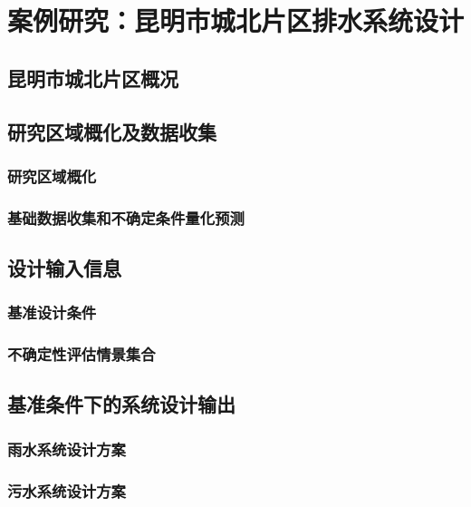 \documentclass[degree=doctor]{sysuthesis}
\begin{document}
\clearpage
\setcounter{page}{109}
\chapter{案例研究：昆明市城北片区排水系统设计}
\section{昆明市城北片区概况}

\clearpage
\setcounter{page}{110}
\section{研究区域概化及数据收集}
\subsection{研究区域概化}

\clearpage
\setcounter{page}{111}
\subsection{基础数据收集和不确定条件量化预测}

\clearpage
\setcounter{page}{115}
\section{设计输入信息}
\subsection{基准设计条件}

\clearpage
\setcounter{page}{120}
\subsection{不确定性评估情景集合}
\section{基准条件下的系统设计输出}
\subsection{雨水系统设计方案}

\clearpage
\setcounter{page}{124}
\subsection{污水系统设计方案}

\clearpage
\setcounter{page}{128}
\end{document}

